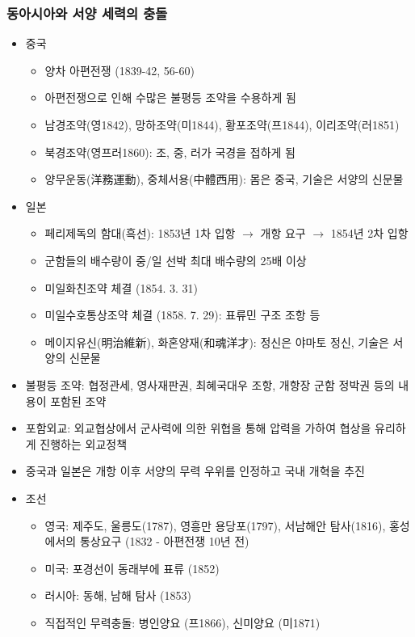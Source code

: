 \subsubsection*{동아시아와 서양 세력의 충돌}
\begin{itemize}
    \item 중국
    \begin{itemize}
        \item 양차 아편전쟁 (1839-42, 56-60)
        \item 아편전쟁으로 인해 수많은 불평등 조약을 수용하게 됨
        \item 남경조약(영1842), 망하조약(미1844), 황포조약(프1844), 이리조약(러1851)
        \item 북경조약(영프러1860): 조, 중, 러가 국경을 접하게 됨
        \item 양무운동(洋務運動), 중체서용(中體西用): 몸은 중국, 기술은 서양의 신문물
    \end{itemize}
    \newpage
    \item 일본
        \begin{itemize}
            \item 페리제독의 함대(흑선): 1853년 1차 입항 $\rightarrow$ 개항 요구 $\rightarrow$ 1854년 2차 입항
            \item 군함들의 배수량이 중/일 선박 최대 배수량의 25배 이상
            \item 미일화친조약 체결 (1854. 3. 31)
            \item 미일수호통상조약 체결 (1858. 7. 29): 표류민 구조 조항 등
            \item 메이지유신(明治維新), 화혼양재(和魂洋才): 정신은 야마토 정신, 기술은 서양의 신문물
        \end{itemize}
    \item 불평등 조약: 협정관세, 영사재판권, 최혜국대우 조항, 개항장 군함 정박권 등의 내용이 포함된 조약
    \item 포함외교: 외교협상에서 군사력에 의한 위협을 통해 압력을 가하여 협상을 유리하게 진행하는 외교정책
    \item 중국과 일본은 개항 이후 서양의 무력 우위를 인정하고 국내 개혁을 추진
    \item 조선
    \begin{itemize}
        \item 영국: 제주도, 울릉도(1787), 영흥만 용당포(1797), 서남해안 탐사(1816), 홍성에서의 통상요구 (1832 - 아편전쟁 10년 전)
        \item 미국: 포경선이 동래부에 표류 (1852)
        \item 러시아: 동해, 남해 탐사 (1853)
        \item 직접적인 무력충돌: 병인양요 (프1866), 신미양요 (미1871)
    \end{itemize}
\end{itemize}

